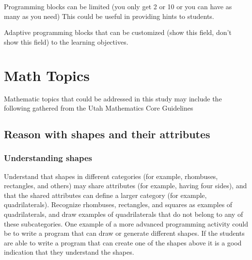 Programming blocks can be limited (you only get 2 or 10 or you can have as many as you need) This could be useful in providing hints to students.

Adaptive programming blocks that can be customized (show this field, don’t show this field) to the learning objectives.

\section*{Math Topics}
Mathematic topics that could be addressed in this study may include the following gathered from the Utah Mathematics Core Guidelines
\subsection*{Reason with shapes and their attributes}
\subsubsection*{Understanding shapes}
Understand that shapes in different categories (for example, rhombuses, rectangles, and others) may share attributes (for example, having four sides), and that the shared attributes can define a larger category (for example, quadrilaterals). Recognize rhombuses, rectangles, and squares as examples of quadrilaterals, and draw examples of quadrilaterals that do not belong to any of these subcategories. 
One example of a more advanced programming activity could be to write a program that can draw or generate different shapes.
If the students are able to write a program that can create one of the shapes above it is a good indication that they understand the shapes. 

